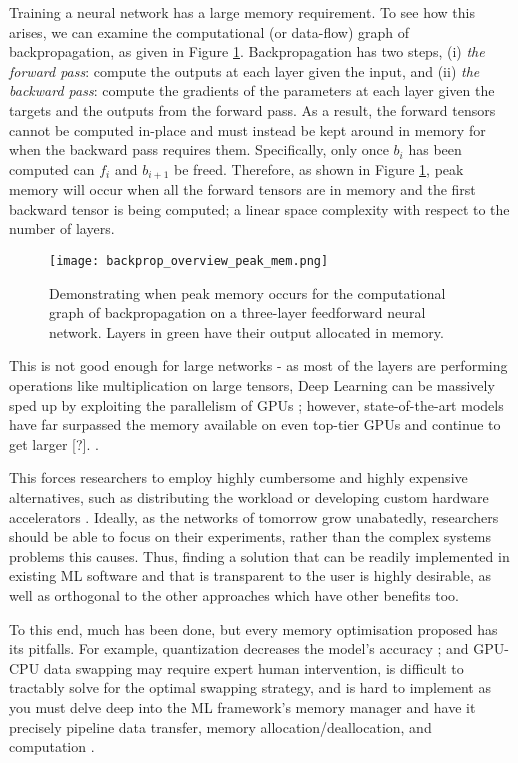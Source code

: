 Training a neural network has a large memory requirement. To see how this arises, we can examine the computational (or data-flow) graph of backpropagation, as given in Figure \ref{fig:1-backprop-peak-mem}. Backpropagation has two steps, (i) \textit{the forward pass}: compute the outputs at each layer given the input, and (ii) \textit{the backward pass}: compute the gradients of the parameters at each layer given the targets and the outputs from the forward pass. As a result, the forward tensors cannot be computed in-place and must instead be kept around in memory for when the backward pass requires them. Specifically, only once \(b_i\) has been computed can \(f_i\) and \(b_{i+1}\) be freed. Therefore, as shown in Figure \ref{fig:1-backprop-peak-mem}, peak memory will occur when all the forward tensors are in memory and the first backward tensor is being computed; a linear space complexity with respect to the number of layers.

\begin{figure}[t]
    \centering
    \texttt{[image: backprop\_overview\_peak\_mem.png]}
    \caption{Demonstrating when peak memory occurs for the computational graph of backpropagation on a three-layer feedforward neural network. Layers in green have their output allocated in memory.}
    \label{fig:1-backprop-peak-mem}
\end{figure}

This is not good enough for large networks - as most of the layers are performing operations like multiplication on large tensors, Deep Learning can be massively sped up by exploiting the parallelism of GPUs \cite{Kayid2018, Scanzio2010, Dogaru2017}; however, state-of-the-art models have far surpassed the memory available on even top-tier GPUs and continue to get larger [?]. .

This forces researchers to employ highly cumbersome and highly expensive alternatives, such as distributing the workload or developing custom hardware accelerators . Ideally, as the networks of tomorrow grow unabatedly, researchers should be able to focus on their experiments, rather than the complex systems problems this causes. Thus, finding a solution that can be readily implemented in existing ML software and that is transparent to the user is highly desirable, as well as orthogonal to the other approaches which have other benefits too.

To this end, much has been done, but every memory optimisation proposed has its pitfalls. For example, quantization decreases the model's accuracy \cite{Zhou2016}; and GPU-CPU data swapping may require expert human intervention, is difficult to tractably solve for the optimal swapping strategy, and is hard to implement as you must delve deep into the ML framework's memory manager and have it precisely pipeline data transfer, memory allocation/deallocation, and computation \cite{Rhu2016, B, Zhang2019, Wang2018}.

